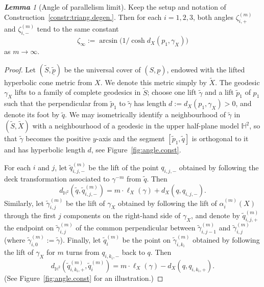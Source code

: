 \documentclass[11pt, letterpaper]{amsart}
\theoremstyle{definition}
\theoremstyle{remark}
\newtheorem{lemma}[theorem]{\rm\bf Lemma}
\newcommand{\up}{\underline{p}}
\newcommand{\bH}{\mathbb{H}}
\numberwithin{equation}{section}
\begin{document}
\begin{lemma}[Angle of parallelism limit]
\label{lem:limit.angle.const}
Keep the setup and notation of Construction~\ref{constr:triang.degen.}.
Then for each \(i=1,2,3\), both angles \(\zeta^{(m)}_{i,+}\) and
\(\zeta^{(m)}_{i,-}\) tend to the same constant
\[
\zeta_{\infty}
:= \arcsin\bigl(1/\cosh d_X(p_1,\gamma_X)\bigr)
\]
as \(m\to\infty\).
\end{lemma}

\begin{proof}
Let \((\tilde{S},\tilde{\underline{p}})\) be the universal cover of \((S,\up)\),
endowed with the lifted hyperbolic cone metric from $X$. We denote this
metric simply by \(\tilde{X}\).
The geodesic \(\gamma_X\) lifts to a family of complete geodesics in \(\tilde{S}\);
choose one lift \(\tilde{\gamma}\) and a lift \(\tilde{p}_1\) of \(p_1\) such
that the perpendicular from \(\tilde{p}_1\) to \(\tilde{\gamma}\) has length
\(d:=d_X(p_1,\gamma_X)>0\), and denote its foot by \(\tilde{q}\).
We may isometrically identify a neighbourhood of \(\tilde{\gamma}\) in
\((\tilde{S},\tilde{X})\) with a neighbourhood of a geodesic in the upper
half-plane model \(\bH^2\), so that \(\tilde{\gamma}\) becomes the positive
\(y\)-axis and the segment \([\tilde{p}_1,\tilde{q}]\) is orthogonal to it and
has hyperbolic length \(d\), see Figure~\ref{fig:angle.const}.

For each \(i\) and \(j\), let \(\tilde{q}^{(m)}_{i,j,-}\) be the lift of the
point \(q_{i,j,-}\) obtained by following the deck transformation associated
to \(\gamma^{-m}\) from \(\tilde{q}\).
Then
\begin{equation}
\label{eq:twist.forward}
d_{\bH^2}(\tilde{q}, \tilde{q}^{(m)}_{i,j,-})
= m\cdot\ell_X(\gamma)+d_X(q,q_{i,j,-}).
\end{equation}
Similarly, let \(\tilde{\gamma}^{(m)}_{i,j}\) be the lift of \(\gamma_X\)
obtained by following the lift of \(\alpha_i^{(m)}(X)\) through the first
\(j\) components on the right-hand side of \(\gamma_X\), and denote by
\(\tilde{q}^{(m)}_{i,j,+}\) the endpoint on  \(\tilde{\gamma}^{(m)}_{i,j}\) of the common perpendicular between
\(\tilde{\gamma}^{(m)}_{i,j-1}\) and \(\tilde{\gamma}^{(m)}_{i,j}\) (where \(\tilde{\gamma}^{(m)}_{i,0}:=\tilde{\gamma}\)).
Finally, let \(\tilde{q}^{(m)}_i\) be the point on \(\tilde{\gamma}^{(m)}_{i,k_i}\)
obtained by following the lift of \(\gamma_X\) for \(m\) turns from
\(q_{i,k_i,-}\) back to \(q\).
Then
\begin{equation}
\label{eq:twist.back}
d_{\bH^2}(\tilde{q}^{(m)}_{i,k_i,+}, \tilde{q}^{(m)}_i)
= m\cdot \ell_{X}(\gamma)-d_X(q, q_{i,k_i,+}).
\end{equation}
(See Figure~\ref{fig:angle.const} for an illustration.)


\end{proof}
\end{document}
